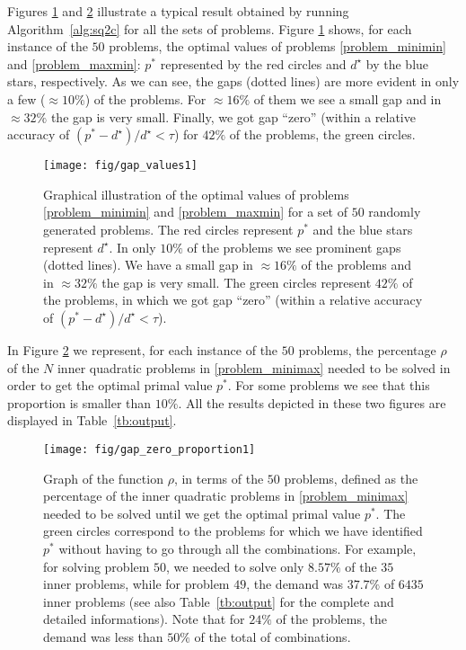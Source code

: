 \documentclass[smallextended,referee,envcountsect]{svjour3}
\begin{document}
Figures \ref{fig2} and \ref{fig3} illustrate a typical result obtained by running 
Algorithm~\ref{alg:sq2c} for all the sets of problems. Figure \ref{fig2} shows, for 
each instance of the $50$ problems, the optimal values of 
problems \eqref{problem_minimin} and \eqref{problem_maxmin}: $p^*$ represented 
by the red circles and $d^\star$ by the blue stars, respectively. As we can see, the 
gaps (dotted lines) are more evident in only a few ($\approx 10\%$) of the problems. 
For $\approx 16\%$ of them we see a small gap and in $\approx 32\%$ the gap is very small. 
Finally, we got gap ``zero'' (within a relative accuracy of 
${(p^*-d^\star)}/{d^\star} < \tau$) for $42\%$ of the problems, the green circles.

\begin{figure}[htbp]
\centering
\texttt{[image: fig/gap\_values1]}
\caption{Graphical illustration of the optimal values of 
problems \eqref{problem_minimin} and \eqref{problem_maxmin} for a set of $50$ randomly 
generated problems. The red circles represent $p^*$ and the blue stars represent 
$d^\star$. In only $10\%$ of the problems we see prominent gaps (dotted lines). We have 
a small gap in $\approx 16\%$ of the problems and in $\approx 32\%$ the gap is very small. 
The green circles represent $42\%$ of the problems, in which we got gap ``zero'' (within 
a relative accuracy of ${(p^*-d^\star)}/{d^\star} < \tau$).}
\label{fig2}
\end{figure}

In Figure \ref{fig3} we represent, for each instance of the $50$ problems, the 
percentage $\rho$ of the $N$ inner quadratic problems in \eqref{problem_minimax} needed 
to be solved in order to get the optimal primal value $p^*$. For some problems we see 
that this proportion is smaller than $10\%$. All the results depicted in these two 
figures are displayed in Table~\ref{tb:output}.

\begin{figure}[htbp]
\centering
\texttt{[image: fig/gap\_zero\_proportion1]}
\caption{Graph of the function $\rho$, in terms of the $50$ problems, defined as the 
percentage of the inner quadratic problems in \eqref{problem_minimax} needed to be 
solved until we get the optimal primal value $p^*$. The green circles correspond to 
the problems for which we have identified $p^*$ without having to go through all the 
combinations. For example, for solving problem $50$, we needed to solve only $8.57\%$ 
of the $35$ inner problems, while for problem $49$, the demand was $37.7\%$ of $6435$ 
inner problems (see also Table~\ref{tb:output} for the complete and detailed 
informations). Note that for $24\%$ of the problems, the demand was less than $50\%$ 
of the total of combinations.}
\label{fig3}
\end{figure}
\end{document}
